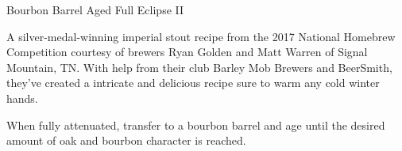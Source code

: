 \stylesection{\styleimperialstout}

\begin{recipe}{Bourbon Barrel Aged Full Eclipse II}

\begin{aboutblock}
A silver-medal-winning imperial stout recipe from the 2017 National Homebrew
Competition courtesy of brewers Ryan Golden and Matt Warren of Signal Mountain, TN.
With help from their club Barley Mob Brewers and BeerSmith, they've created a
intricate and delicious recipe sure to warm any cold winter hands. \sourceaha
\end{aboutblock}


\begin{methodandtiming}
 
\begin{mashsteps}
\end{mashsteps}

\begin{fermentationsteps}
\end{fermentationsteps}

\begin{directions}
When fully attenuated, transfer to a bourbon barrel and age until the desired amount
of oak and bourbon character is reached.
\end{directions}

\end{methodandtiming}

\recipebreak

\begin{ingredientsblock}

\begin{malts}
\end{malts}

\begin{hops}

\end{hops}


\end{ingredientsblock}

\end{recipe}

